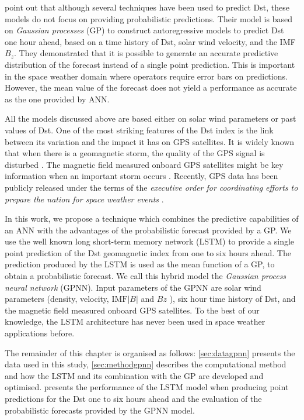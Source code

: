 \citet{ChandorkarDst} point out that although several techniques have been used to predict Dst, 
these models do not focus on providing probabilistic predictions. Their model is based on 
\emph{Gaussian processes} (GP) to construct autoregressive models to predict Dst one hour ahead, 
based on a time history of Dst, solar wind velocity, and the IMF $B_z$. They demonstrated 
that it is possible to generate an accurate predictive distribution of the forecast instead of a 
single point prediction. This is important in the space weather domain where operators require 
error bars on predictions. However, the mean value of the forecast does not yield a performance as 
accurate as the one provided by ANN. 

All the models discussed above are based either on solar wind parameters or past values of Dst. One 
of the most striking features of the Dst index is the link between its variation and the impact it 
has on GPS satellites. It is widely known that when there is a geomagnetic storm, the quality of 
the GPS signal is disturbed \citep{astafyeva2014geomagnetic}. The magnetic field measured onboard 
GPS satellites might be key information when an important storm occurs \citep{morley2017energetic}. 
Recently, GPS data has been publicly released under the terms of the 
\emph{executive order for coordinating efforts to prepare the nation for space weather events} 
\citep{obamasw}.

In this work, we propose a technique which combines the predictive capabilities of an ANN with the 
advantages of the probabilistic forecast provided by a GP. We use the well known 
long short-term memory network (LSTM) \citep{hochreiter1997long} to provide a single point 
prediction of the Dst geomagnetic index from one to six hours ahead. The prediction produced by the 
LSTM is used as the mean function of a GP, to obtain a probabilistic forecast. We call this hybrid 
model the \emph{Gaussian process neural network} (GPNN). Input parameters of the GPNN are solar 
wind parameters (density, velocity, $\text{IMF}\vert B \vert$  and $Bz$ ), six hour time history 
of Dst, and the magnetic field measured onboard GPS satellites. To the best of our knowledge, the 
LSTM architecture has never been used in space weather applications before.

The remainder of this chapter is organised as follows: \cref{sec:datagpnn} presents the 
data used in this study, \cref{sec:methodgpnn} describes the computational method and 
how the LSTM and its combination with the GP are developed and optimised.  
presents the performance of the LSTM model when producing point predictions for the Dst one to 
six hours ahead and the evaluation of the probabilistic forecasts provided by the GPNN model. 


